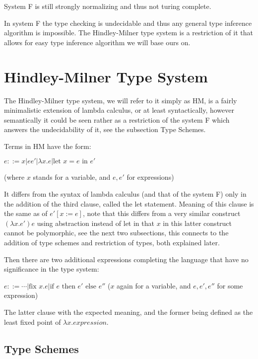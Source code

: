 System F is still strongly normalizing and thus not turing complete. %

In system F the type checking is undecidable and thus any general type inference algorithm is impossible.
The Hindley-Milner type system is a restriction of it %
that allows for easy type inference algorithm we will base ours on.

\section{Hindley-Milner Type System}

The Hindley-Milner type system, we will refer to it simply as HM, is a fairly minimalistic extension of lambda calculus, or at least syntactically, however semantically it could be seen rather as a restriction of the system F which answers the undecidability of it, see the subsection Type Schemes. %

Terms in HM have the form:

$e ::= x | e e' | \lambda x . e | \text{let } x = e \text{ in } e'$

(where $x$ stands for a variable, and $e, e'$ for expressions)

It differs from the syntax of lambda calculus (and that of the system F) only in the addition of the third clause, called the let statement. Meaning of this clause is the same as of $e' [x := e]$, note that this differs from a very similar construct $(\lambda x . e') e$ using abstraction instead of let in that $x$ in this latter construct cannot be polymorphic, see the next two subsections, this connects to the addition of type schemes and restriction of types, both explained later. %

Then there are two additional expressions completing the language that have no significance in the type system: %

$e ::= \cdots | \text{fix } x . e | \text{if } e \text{ then } e' \text{ else } e''$
($x$ again for a variable, and $e, e', e''$ for some expression)

The latter clause with the expected meaning, and the former being defined as the least fixed point of $\lambda x . expression$. %

\subsection{Type Schemes}

